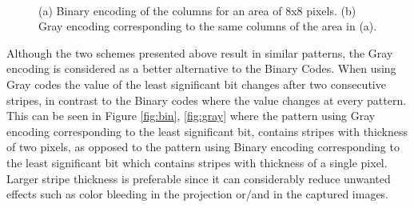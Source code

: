 \documentclass[final,12pt,3p]{elsarticle}
\begin{document}
\begin{figure}[!ht]
	\centering
	\\
	\caption{(a) Binary encoding of the columns for an area of 8x8 pixels. (b) Gray encoding corresponding to the same columns of the area in (a).}
\end{figure}

Although the two schemes presented above result in similar patterns, the Gray encoding is considered as a better alternative to the Binary Codes. When using Gray codes the value of the least significant bit changes after two consecutive stripes, in contrast to the Binary codes where the value changes at every pattern. This can be seen in Figure \ref{fig:bin}, \ref{fig:gray} where the pattern using Gray encoding corresponding to the least significant bit, contains stripes with thickness of two pixels, as opposed to the pattern using Binary encoding corresponding to the least significant bit which contains stripes with thickness of a single pixel. Larger stripe thickness is preferable since it can considerably reduce unwanted effects such as color bleeding in the projection or/and in the captured images.
\end{document}
